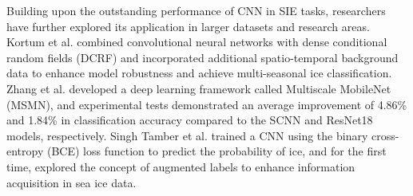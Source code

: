 Building upon the outstanding performance of CNN in SIE tasks, researchers have further explored its application in larger datasets and research areas. Kortum et al. \cite{98kortum2022robust} combined convolutional neural networks with dense conditional random fields (DCRF) and incorporated additional spatio-temporal background data to enhance model robustness and achieve multi-seasonal ice classification. Zhang et al. \cite{97zhang2022improved} developed a deep learning framework called Multiscale MobileNet (MSMN), and experimental tests demonstrated an average improvement of 4.86\% and 1.84\% in classification accuracy compared to the SCNN and ResNet18 models, respectively. Singh Tamber et al. \cite{99tamber2022accounting} trained a CNN using the binary cross-entropy (BCE) loss function to predict the probability of ice, and for the first time, explored the concept of augmented labels to enhance information acquisition in sea ice data.

